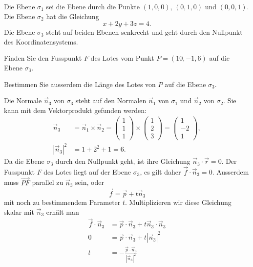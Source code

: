 Die Ebene $\sigma_1$ sei die Ebene durch die Punkte $(1,0,0)$,
$(0,1,0)$ und $(0,0,1)$.
Die Ebene $\sigma_2$ hat die Gleichung
\[
x+2y+3z=4.
\]
Die Ebene $\sigma_3$ steht auf beiden Ebenen senkrecht und geht
durch den Nullpunkt des Koordinatensystems.
\begin{teilaufgaben}
\item
Finden Sie den Fusspunkt $F$ des Lotes vom Punkt $P=(10,-1,6)$ auf die
Ebene $\sigma_3$.
\item
Bestimmen Sie ausserdem die Länge des Lotes von $P$ auf die Ebene $\sigma_3$.
\end{teilaufgaben}


\begin{loesung}
\begin{teilaufgaben}
\item
Die Normale $\vec n_3$ von $\sigma_3$ steht auf den Normalen
$\vec n_1$ von $\sigma_1$ und $\vec n_2$ von $\sigma_2$.
Sie kann mit dem Vektorprodukt gefunden werden:
\begin{align*}
\vec n_3
&=
\vec n_1 \times \vec n_2
=
\begin{pmatrix}1\\1\\1\end{pmatrix}
\times
\begin{pmatrix}1\\2\\3\end{pmatrix}
=
\begin{pmatrix}
1\\-2\\1
\end{pmatrix},
\\
|\vec n_3|^2
&=
1+2^2 + 1=6.
\end{align*}
Da die Ebene $\sigma_3$ durch den Nullpunkt geht, ist ihre Gleichung
$\vec n_3\cdot\vec r=0$.
Der Fusspunkt $F$ des Lotes liegt auf der Ebene $\sigma_3$, es gilt
daher $\vec f\cdot \vec n_3 = 0$.
Ausserdem muss $\overrightarrow{PF}$ parallel zu $\vec n_3$ sein,
oder 
\[
\vec f = \vec p + t\vec n_3
\]
mit noch zu bestimmendem  Parameter $t$.
Multiplizieren wir diese Gleichung skalar mit $\vec n_3$ erhält man
\begin{align*}
\vec f\cdot \vec n_3
&=
\vec p\cdot\vec n_3 + t\vec n_3\cdot\vec n_3
\\
0
&=
\vec p\cdot\vec n_3 + t|\vec n_3|^2
\\
t
&=
-\frac{\vec p\cdot\vec n_3}{|\vec n_3|^2}

\end{align*}
\end{teilaufgaben}
\end{loesung}
